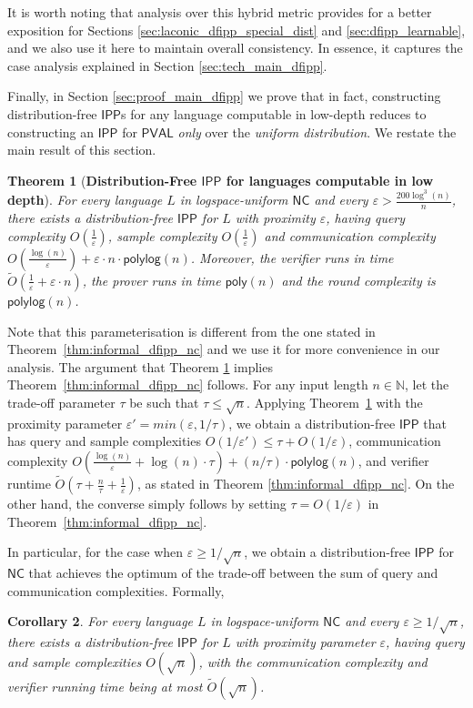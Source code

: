 \documentclass[10pt,a4paper]{article}
\newtheorem{theorem}{Theorem}[section]
\newtheorem{corollary}[theorem]{Corollary}
\newcommand{\poly}{\mathsf{poly}}
\newcommand{\polylog}{\mathsf{polylog}}
\newcommand{\NC}{\mathsf{NC}}
\newcommand{\PVAL}{\mathsf{PVAL}}
\newcommand{\IPP}{\mathsf{IPP}}
\newcommand{\N}{\mathbb{N}}
\newcommand{\eps}{\varepsilon}
\begin{document}
It is worth noting that analysis over this hybrid metric provides for a better exposition for Sections \ref{sec:laconic_dfipp_special_dist} and \ref{sec:dfipp_learnable}, and we also use it here to maintain overall consistency. In essence, it captures the case analysis explained in Section \ref{sec:tech_main_dfipp}. 

Finally, in Section \ref{sec:proof_main_dfipp} we prove that in fact, constructing distribution-free $\IPP$s for any language computable in low-depth reduces to constructing an $\IPP$ for $\PVAL$ \textit{only} over the \textit{uniform distribution}. We restate the main result of this section.

\begin{theorem}[\textbf{Distribution-Free $\IPP$ for languages computable in low depth}]\label{thm:informal_dfipp_nc_restated}
    For every language $L$ in logspace-uniform $\NC$ and every $\varepsilon > \frac{200\log^{3}(n)}{n}$, there exists a distribution-free $\IPP$ for $L$ with proximity $\varepsilon$, having query complexity $O\left( \frac{1}{\varepsilon} \right)$, sample complexity $O\left( \frac{1}{\varepsilon} \right)$ and communication complexity $O\left( \frac{\log (n)}{\varepsilon}\right) + \varepsilon \cdot n\cdot \polylog(n)$. Moreover, the verifier runs in time $\tilde{O}\left( \frac{1}{\varepsilon}+\varepsilon\cdot n \right)$, the prover runs in time $\poly(n)$ and the round complexity is $\polylog(n)$.
\end{theorem}

Note that this parameterisation is different from the one stated in Theorem~\ref{thm:informal_dfipp_nc} and we use it for more convenience in our analysis. The argument that Theorem \ref{thm:informal_dfipp_nc_restated} implies Theorem~\ref{thm:informal_dfipp_nc} follows. For any input length $n \in \N$, let the trade-off parameter $\tau$ be such that $\tau \leq \sqrt{n}$. Applying Theorem~\ref{thm:informal_dfipp_nc_restated} with the proximity parameter $\eps'=min(\eps, 1/\tau)$, we obtain a distribution-free $\IPP$ that has query and sample complexities $O(1/\eps') \leq \tau+O(1/\eps)$, communication complexity $O\left( \frac{\log (n)}{\eps} +\log (n) \cdot \tau\right) + (n/\tau)\cdot \polylog(n)$, and verifier runtime $\tilde{O}\left( \tau+\frac{n}{\tau}+\frac{1}{\eps} \right)$, as stated in Theorem \ref{thm:informal_dfipp_nc}. On the other hand, the converse simply follows by setting $\tau = O(1/\eps)$ in Theorem~\ref{thm:informal_dfipp_nc}.

In particular, for the case when $\varepsilon \geq 1/\sqrt{n}$, we obtain a distribution-free $\IPP$ for $\NC$ that achieves the optimum of the trade-off between the sum of query and communication complexities. Formally,
\begin{corollary}
    \label{cor:dfipp_for_sqrt_error}
    For every language $L$ in logspace-uniform $\NC$ and every $\varepsilon \geq 1/\sqrt{n}$, there exists a distribution-free $\IPP$ for $L$ with proximity parameter $\varepsilon$, having query and sample complexities $O(\sqrt{n})$, with the communication complexity and verifier running time being at most $\tilde{O}(\sqrt{n})$.
\end{corollary}
\end{document}
